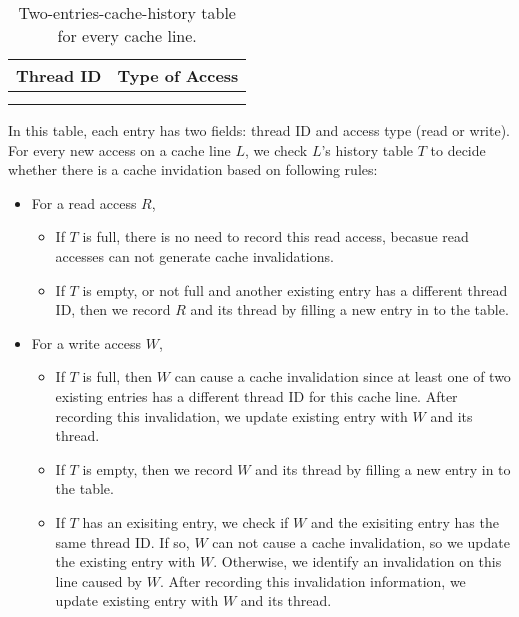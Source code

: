 \begin{table}
\centering
  \begin{tabular}{ l | r }
    \hline
    {Thread ID} & {Type of Access} \\ \hline
    \hline
     &   \\ \hline
     &   \\ \hline
  \end{tabular}
  \caption{Two-entries-cache-history table for every cache line. \label{table:cachehistory}}
\end{table} 

In this table, each entry has two fields: thread ID and access type (read or write). 
For every new access on a cache line $L$, we check $L$'s history table
$T$ to decide whether there is a cache invidation based on following rules:

\begin{itemize}
\item
  For a read access $R$, 
  \begin{itemize}
    \item
      If $T$ is full, there is no need to record this read access, becasue
      read accesses can not generate cache invalidations.
    \item
      If $T$ is empty, or not full and another existing entry has a different thread
      ID, then we record $R$ and its thread by filling a new entry in to the table. 
  \end{itemize}
\item
  For a write access $W$, 
  \begin{itemize}
    \item
      If $T$ is full, then $W$ can cause a cache invalidation since at least 
      one of two existing entries has a different thread ID for this cache line. 
      After recording this invalidation, we update 
      existing entry with $W$ and its thread.
    \item
      If $T$ is empty,
      then we record $W$ and its thread by filling a new entry in to the table. 
    \item
      If $T$ has an exisiting entry,
      we check if $W$ and the exisiting entry has the same thread ID. If
      so, $W$ can not cause a cache invalidation, so we update the existing
      entry with $W$. Otherwise, we identify an invalidation on this line caused by $W$. 
      After recording this invalidation information, we update 
      existing entry with $W$ and its thread.
  \end{itemize}
\end{itemize}

